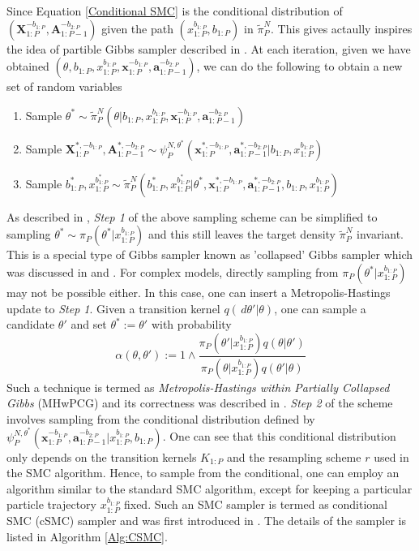 \documentclass[12pt,a4paper]{article}
\begin{document}
Since Equation \eqref{Conditional SMC} is the conditional distribution of \(\left(\textbf{X}_{1:P}^{-b_{1:P}},\textbf{A}_{1:P-1}^{-b_{2:P}}\right)\) given the path \(\left(x_{1:P}^{b_{1:P}},b_{1:P}\right)\) in \(\tilde{\pi}_P^N\). This gives actaully inspires the idea of partible Gibbs sampler described in \cite{andrieu2010particle}. At each iteration, given we have obtained \(\left(\theta,b_{1:P},x_{1:P}^{b_{1:P}},\textbf{x}_{1:P}^{-b_{1:P}},\textbf{a}_{1:P-1}^{-b_{2:P}}\right)\), we can do the following to obtain a new set of random variables

\begin{enumerate}[label=\textit{Step \arabic*.},leftmargin=*]
    \item Sample $\theta^{*} \sim \tilde{\pi}_P^N\left(\theta|b_{1:P},x_{1:P}^{b_{1:P}},\textbf{x}_{1:P}^{-b_{1:P}},\textbf{a}_{1:P-1}^{-b_{2:P}}\right)$ 
    \item Sample $\textbf{X}_{1:P}^{*,-b_{1:P}},\textbf{A}_{1:P-1}^{*,-b_{2:P}} \sim \psi_P^{N,\theta^{*}}\left(\textbf{x}_{1:P}^{*,-b_{1:P}},\textbf{a}_{1:P-1}^{*,-b_{2:P}}|b_{1:P},x_{1:P}^{b_{1:P}}\right)$
    \item Sample $b_{1:P}^{*},x_{1:P}^{b_{1:P}^{*}} \sim \tilde{\pi}_P^N\left(b_{1:P}^{*},x_{1:P}^{b_{1:P}^{*}}|\theta^{*},\textbf{x}_{1:P}^{*,-b_{1:P}},\textbf{a}_{1:P-1}^{*,-b_{2:P}},b_{1:P},x_{1:P}^{b_{1:P}}\right)$
\end{enumerate}

As described in \cite{andrieu2010particle}, \textit{Step 1} of the above sampling scheme can be simplified to sampling $\theta^{*} \sim \pi_P(\theta^{*}|x_{1:P}^{b_{1:P}})$ and this still leaves the target density $\tilde{\pi}_P^N$ invariant. This is a special type of Gibbs sampler known as 'collapsed' Gibbs sampler which was discussed in \cite{liu2001monte} and \cite{van2008partially}. For complex models, directly sampling from \(\pi_P(\theta^{*}|x_{1:P}^{b_{1:P}})\) may not be possible either. In this case, one can insert a Metropolis-Hastings update to \textit{Step 1}. Given a transition kernel \(q(\,d\theta'|\theta)\), one can sample a candidate \(\theta'\) and set \(\theta^{*} := \theta'\) with probability 
\[
    \alpha(\theta,\theta') := 1 \wedge  \frac{\pi_P(\theta'|x_{1:P}^{b_{1:P}})q(\theta|\theta')}{\pi_P(\theta|x_{1:P}^{b_{1:P}})q(\theta'|\theta)} 
\]
Such a technique is termed as \textit{Metropolis-Hastings within Partially Collapsed Gibbs} (MHwPCG) and its correctness was described in \cite{van2008partially}. \textit{Step 2} of the scheme involves sampling from the conditional distribution defined by \(\psi_{P}^{N,\theta^{*}}\left(\mathbf{x}_{1:P}^{-b_{1:P}},\mathbf{a}_{1:P-1}^{-b_{2:P}}|x_{1:P}^{b_{1:P}},b_{1:P}\right)\). One can see that this conditional distribution only depends on the transition kernels $K_{1:P}$ and the resampling scheme $r$ used in the SMC algorithm. Hence, to sample from the conditional, one can employ an algorithm similar to the standard SMC algorithm, except for keeping a particular particle trajectory \(x_{1:P}^{b_{1:P}}\) fixed. Such an SMC sampler is termed as conditional SMC (cSMC) sampler and was first introduced in \cite{andrieu2010particle}. The details of the sampler is listed in Algorithm \ref{Alg:CSMC}.
\end{document}

